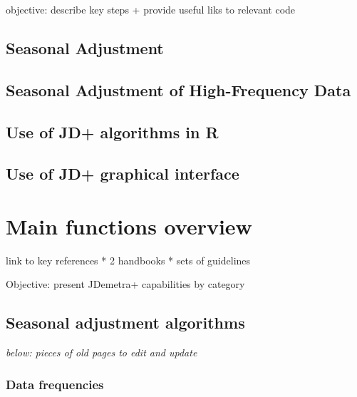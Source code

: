 \documentclass[
  letterpaper,
  DIV=11,
  numbers=noendperiod]{scrreprt}
\begin{document}
objective: describe key steps + provide useful liks to relevant code

\hypertarget{seasonal-adjustment}{%
\section{Seasonal Adjustment}\label{seasonal-adjustment}}

\hypertarget{seasonal-adjustment-of-high-frequency-data}{%
\section{Seasonal Adjustment of High-Frequency
Data}\label{seasonal-adjustment-of-high-frequency-data}}

\hypertarget{use-of-jd-algorithms-in-r}{%
\section{Use of JD+ algorithms in R}\label{use-of-jd-algorithms-in-r}}

\hypertarget{use-of-jd-graphical-interface}{%
\section{Use of JD+ graphical
interface}\label{use-of-jd-graphical-interface}}

\hypertarget{main-functions-overview}{%
\chapter{Main functions overview}\label{main-functions-overview}}

link to key references * 2 handbooks * sets of guidelines

Objective: present JDemetra+ capabilities by category

\hypertarget{seasonal-adjustment-algorithms}{%
\section{Seasonal adjustment
algorithms}\label{seasonal-adjustment-algorithms}}

\emph{below: pieces of old pages to edit and update}

\hypertarget{data-frequencies}{%
\subsection{Data frequencies}\label{data-frequencies}}
\end{document}
